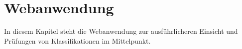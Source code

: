 \section{Webanwendung}
    In diesem Kapitel steht die Webanwendung zur ausführlicheren Einsicht
    und Prüfungen von Klassifikationen im Mittelpunkt.

    
    